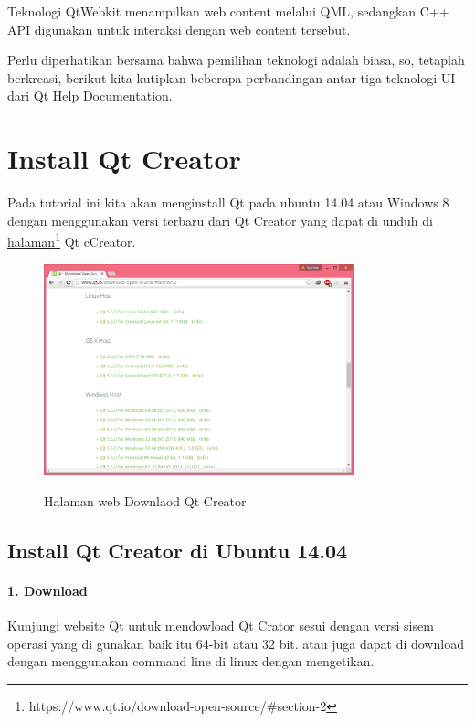 Teknologi QtWebkit menampilkan web content melalui QML, sedangkan C++
API digunakan untuk interaksi dengan web content tersebut.

Perlu diperhatikan bersama bahwa pemilihan teknologi adalah biasa, so,
tetaplah berkreasi, berikut kita kutipkan beberapa perbandingan antar
tiga teknologi UI dari Qt Help Documentation.

\section{ Install Qt Creator}\label{install-qt-creator}

Pada tutorial ini kita akan menginstall Qt pada ubuntu 14.04 atau
Windows 8 dengan menggunakan versi terbaru dari Qt Creator yang dapat di
unduh di \href{http://www.qt.io/download}{halaman}\footnote{https://www.qt.io/download-open-source/\#section-2} Qt cCreator.

\begin{figure}[htbp]
\centering
\includegraphics[width=0.8\textwidth]{../manuscript/images/qt-downloads.PNG}
\label{halaman-web-download-qt}
\caption{Halaman web Downlaod Qt Creator}
\end{figure}

\subsection{Install Qt Creator di Ubuntu
14.04}\label{install-qt-creator-di-ubuntu-14.04}

\paragraph{1. Download}\label{download}

Kunjungi website Qt untuk mendowload Qt Crator sesui dengan versi sisem
operasi yang di gunakan baik itu 64-bit atau 32 bit. atau juga dapat di
download dengan menggunakan command line di linux dengan mengetikan.

